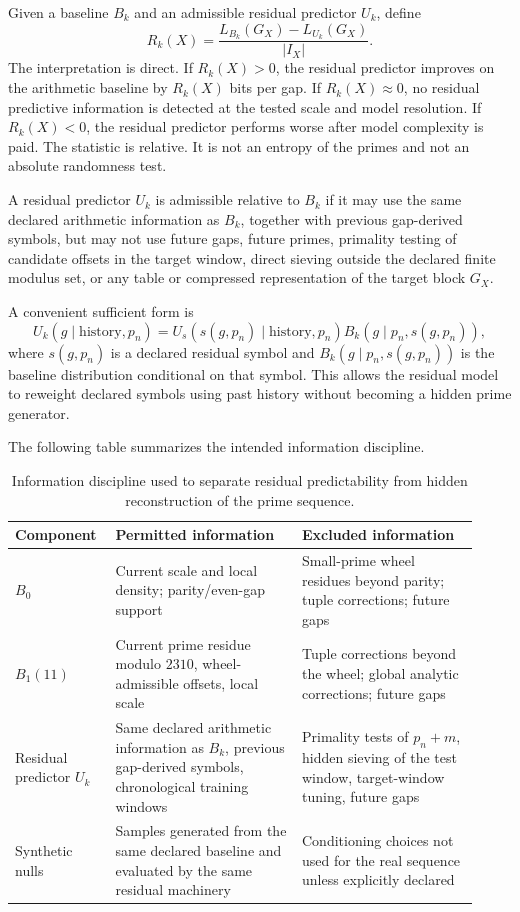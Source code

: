 \documentclass[11pt]{article}
\begin{document}
Given a baseline $B_k$ and an admissible residual predictor $U_k$, define
\[
R_k(X)=\frac{L_{B_k}(G_X)-L_{U_k}(G_X)}{|I_X|}.
\]
The interpretation is direct. If $R_k(X)>0$, the residual predictor improves on the arithmetic baseline by $R_k(X)$ bits per gap. If $R_k(X)\approx0$, no residual predictive information is detected at the tested scale and model resolution. If $R_k(X)<0$, the residual predictor performs worse after model complexity is paid. The statistic is relative. It is not an entropy of the primes and not an absolute randomness test.

A residual predictor $U_k$ is admissible relative to $B_k$ if it may use the same declared arithmetic information as $B_k$, together with previous gap-derived symbols, but may not use future gaps, future primes, primality testing of candidate offsets in the target window, direct sieving outside the declared finite modulus set, or any table or compressed representation of the target block $G_X$.

A convenient sufficient form is
\[
U_k(g\mid\text{history},p_n)=U_s(s(g,p_n)\mid\text{history},p_n)B_k(g\mid p_n,s(g,p_n)),
\]
where $s(g,p_n)$ is a declared residual symbol and $B_k(g\mid p_n,s(g,p_n))$ is the baseline distribution conditional on that symbol. This allows the residual model to reweight declared symbols using past history without becoming a hidden prime generator.

The following table summarizes the intended information discipline.

\begin{table}[ht]
\centering
\small
\begin{tabular}{p{0.18\linewidth}p{0.38\linewidth}p{0.36\linewidth}}
\toprule
Component & Permitted information & Excluded information \\
\midrule
$B_0$ & Current scale and local density; parity/even-gap support & Small-prime wheel residues beyond parity; tuple corrections; future gaps \\
$B_1(11)$ & Current prime residue modulo $2310$, wheel-admissible offsets, local scale & Tuple corrections beyond the wheel; global analytic corrections; future gaps \\
Residual predictor $U_k$ & Same declared arithmetic information as $B_k$, previous gap-derived symbols, chronological training windows & Primality tests of $p_n+m$, hidden sieving of the test window, target-window tuning, future gaps \\
Synthetic nulls & Samples generated from the same declared baseline and evaluated by the same residual machinery & Conditioning choices not used for the real sequence unless explicitly declared \\
\bottomrule
\end{tabular}
\caption{Information discipline used to separate residual predictability from hidden reconstruction of the prime sequence.}
\label{tab:information-discipline}
\end{table}
\end{document}
